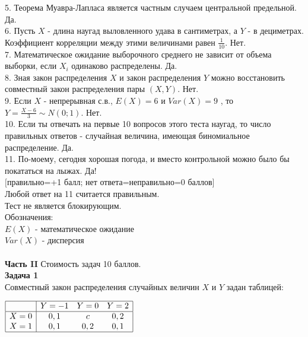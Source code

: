 \documentclass[pdftex,12pt,a4paper]{article}
\begin{document}
5. Теорема Муавра-Лапласа является частным случаем центральной
предельной. Да. \\

6. Пусть $X$ - длина наугад выловленного удава в сантиметрах, а
$Y$ - в дециметрах. Коэффициент корреляции между этими
величинами равен $\frac{1}{10}$. Нет. \\

7. Математическое ожидание выборочного среднего не зависит от
объема выборки, если $X_{i}$ одинаково распределены. Да.  \\

8. Зная закон распределения $X$ и закон распределения $Y$
можно восстановить совместный закон распределения пары $(X,Y)$. Нет. \\

9. Если  $X$  - непрерывная с.в.,  $E\left(X\right)=6$  и
$Var\left(X\right)=9$ , то  $Y=\frac{X-6}{3} \sim
N\left(0;1\right)$.  Нет. \\

10. Если ты отвечать на первые 10 вопросов этого теста наугад, то
число правильных ответов - случайная величина, имеющая
биномиальное распределение. Да.  \\

11. По-моему, сегодня хорошая погода, и вместо контрольной можно
было бы покататься на лыжах. Да! \\


$[$правильно=+1 балл; нет ответа=неправильно=0 баллов$]$ \\
Любой ответ на 11 считается правильным. \\
Тест не является блокирующим. \\
Обозначения: \\
$E(X)$ - математическое ожидание \\
$Var(X)$ - дисперсия \\ \\




\pagebreak \textbf{Часть II} Стоимость задач 10 баллов. \\


\textbf{Задача 1} \\ %
Совместный закон распределения случайных величин  $X$  и  $Y$
задан таблицей:

$\begin{array}{|c|ccc|} \hline {} & {Y=-1} & {Y=0} & {Y=2}
\\  \hline {X=0} & {0,1} & {c} & {0,2}
\\ {X=1} & {0,1} & {0,2} & {0,1} \\  \hline  \end{array}$
\end{document}
